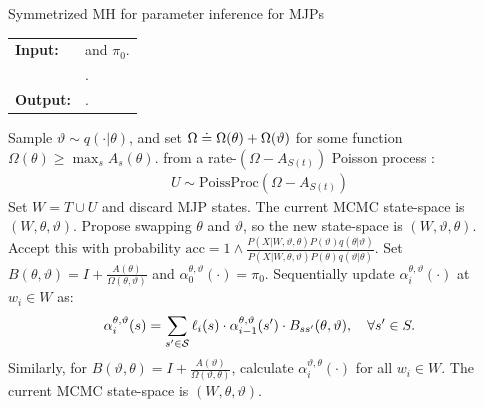 \begin{algorithm} %
   \caption{Symmetrized MH for parameter inference for MJPs }
   \label{alg:MH_improved}
  \begin{tabular}{l l}
   \textbf{Input:  } & \text{The observations $X$,}
                      \text{the MJP path $S(t) = (S, T)$, parameters $\theta$} and $\pi_0$.\\ 
                     & \text{A  Metropolis-Hasting proposal $q(\cdot | \theta)$}.\\
   \textbf{Output:  }& \text{A new MJP trajectory $S'(t) = (S', T')$, 
                            new MJP parameters $\theta'$}.\\
   \hline
   \end{tabular}
   \begin{algorithmic}[1]
      \State Sample $\vartheta \sim q(\cdot| \theta)$, and 
      set %
	$\Omega \doteq \Omega(\theta) + \Omega(\vartheta)$ for some function 
    $\Omega(\theta) \ge \max_s A_s(\theta)$.
       from a rate-$(\Omega-A_{S(t)})$ Poisson process : 
\begin{align*}
  U \sim \text{PoissProc}(\Omega - A_{S(t)}) 
\end{align*}
    \State Set $W = T \cup U$ and discard MJP states.
    \State The current MCMC state-space is $(W,\theta,\vartheta)$. 
    Propose swapping $\theta$ and $\vartheta$, so the new state-space is $(W,\vartheta,\theta)$. 
     Accept this with probability 
     $
     \text{acc} 
        =  1 \wedge \frac{P(X| W,\vartheta,\theta)P(\vartheta)q(\theta|\vartheta)}
        {P(X| W,\theta, \vartheta)P(\theta) q(\vartheta|\theta)}.
        $
    \State Set $B(\theta,\vartheta) = I + \frac{A(\theta)}{\Omega(\theta, \vartheta)}$ and $\alpha^{\theta, \vartheta}_0(\cdot) = \pi_0$.
    Sequentially update $\alpha^{\theta,\vartheta}_i(\cdot)$ at $w_i \in W$ as: 
    $$\alpha^{\theta,\vartheta}_i(s) = \sum_{s' \in {\mathcal S}} \ell_i(s) \cdot \alpha^{\theta,\vartheta}_{i-1}(s')\cdot B_{ss'}(\theta,\vartheta), \quad \forall s' \in S. $$
    Similarly, for $B(\vartheta,\theta) = I + \frac{A(\vartheta)}{\Omega(\vartheta, \theta)}$, calculate $\alpha^{\vartheta,\theta}_i(\cdot)$ for all $w_i \in W$.
    \State The current MCMC state-space is $(W,\theta,\vartheta)$. 

\end{algorithmic}
\end{algorithm}
